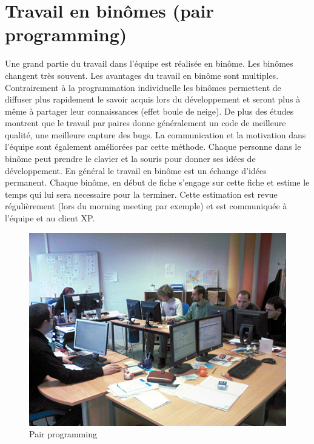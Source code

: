 \section{Travail en binômes (pair programming)}
Une grand partie du travail dans l'équipe est réalisée en binôme. Les binômes changent très souvent. Les avantages du travail en binôme sont multiples. Contrairement à la programmation individuelle les binômes permettent de diffuser plus rapidement le savoir acquis lors du développement et seront plus à même à partager leur connaissances (effet boule de neige). De plus des études montrent que le travail par paires donne généralement un code de meilleure qualité, une meilleure capture des bugs. La communication et la motivation dans l'équipe sont également améliorées par cette méthode. Chaque personne dans le binôme peut prendre le clavier et la souris pour donner ses idées de développement. En général le travail en binôme est un échange d'idées permanent. Chaque binôme, en début de fiche s'engage sur cette fiche et estime le temps qui lui sera necessaire pour la terminer. Cette estimation est revue régulièrement (lors du morning meeting par exemple) et est communiquée à l'équipe et au client XP.

\begin{figure}[!ht]
\centering
\includegraphics[scale=0.15]{Illustrations/SP_A0188.jpg}
\caption{Pair programming}
\label{fig:Pair programming}
\end{figure}

